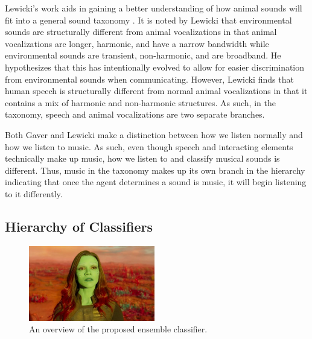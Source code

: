 Lewicki's work aids in gaining a better understanding of how animal sounds will
fit into a general sound taxonomy \cite{lewicki-efficient-2002}. It is noted by
Lewicki that environmental sounds are structurally different from animal
vocalizations in that animal vocalizations are longer, harmonic, and have a
narrow bandwidth while environmental sounds are transient, non-harmonic, and are
broadband. He hypothesizes that this has intentionally evolved to allow for
easier discrimination from environmental sounds when communicating. However,
Lewicki finds that human speech is structurally different from normal animal
vocalizations in that it contains a mix of harmonic and non-harmonic structures.
As such, in the taxonomy, speech and animal vocalizations are two separate
branches.

Both Gaver and Lewicki make a distinction between how we listen normally and how
we listen to music. As such, even though speech and interacting elements
technically make up music, how we listen to and classify musical sounds is
different. Thus, music in the taxonomy makes up its own branch in the hierarchy
indicating that once the agent determines a sound is music, it will begin
listening to it differently.

\subsection{Hierarchy of Classifiers}



\begin{figure}[h!]
    \centering
    \includegraphics[width=0.49\textwidth]{figures/classifier-hierarchy.jpg}
    \caption{An overview of the proposed ensemble classifier.}
    \label{fig:classifier-hierarchy}
\end{figure}

